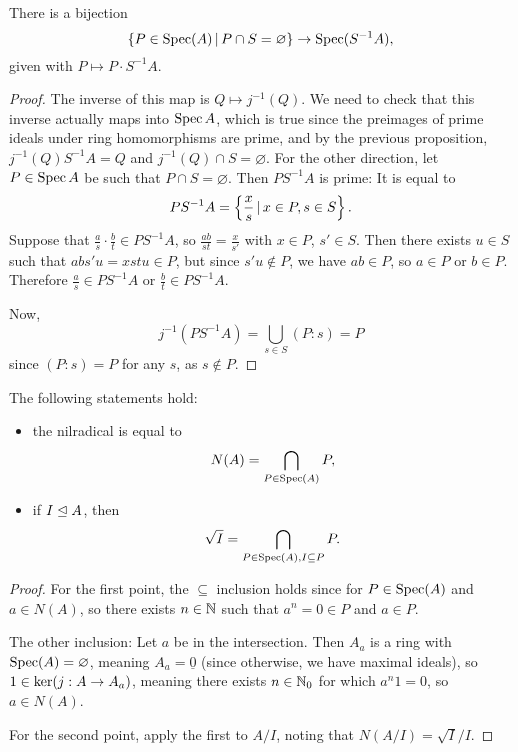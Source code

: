 \begin{corollary}
  There is a bijection
  \[
	\{ P \in \operatorname{Spec}(A) \,|\, P \cap S = \varnothing \}
	\to \operatorname{Spec}(S^{-1}A),
  \]
  given with $P \mapsto P \cdot S^{-1} A$.
\end{corollary}

\begin{proof}
  The inverse of this map is $Q \mapsto j^{-1}(Q)$.
  We need to check that this inverse actually maps into $\operatorname{Spec} A$, which is true
  since the preimages of prime ideals under ring homomorphisms are prime,
  and by the previous proposition, $j^{-1}(Q) S^{-1} A = Q$ and $j^{-1}(Q) \cap
  S = \varnothing$.
  For the other direction, let $P \in \operatorname{Spec} A$ be such that $P \cap S =
  \varnothing$.
  Then $P S^{-1} A$ is prime:
  It is equal to
  \[
	P S^{-1} A = \left\{ \frac{x}{s} \,|\, x \in P, s \in S \right\}.
  \]
  Suppose that $\frac{a}{s} \cdot \frac{b}{t} \in P S^{-1} A$, so $\frac{ab}{st}
  = \frac{x}{s'}$ with $x \in P$, $s' \in S$.
  Then there exists $u \in S$ such that $abs'u = xstu \in P$, but since $s'u
  \notin P$, we have $ab \in P$, so $a \in P$ or $b \in P$.
  Therefore $\frac{a}{s} \in P S^{-1} A$ or $\frac{b}{t} \in PS^{-1} A$.

  Now,
  \[
	j^{-1} (P S^{-1} A) = \bigcup_{s \in S} (P:s) = P
  \]
  since $(P:s) = P$ for any $s$, as $s \notin P$.
\end{proof}

\begin{corollary}
  The following statements hold:
  \begin{itemize}
  \item the nilradical is equal to
	\[
	  N(A) = \bigcap_{P \in \operatorname{Spec}(A)} P,
	\]
  \item if $I \trianglelefteq A$, then
	\[
	  \sqrt{I} = \bigcap_{P \in \operatorname{Spec}(A), I \subseteq P} P.
	\]
  \end{itemize}
\end{corollary}

\begin{proof}
  For the first point, the $\subseteq$ inclusion holds since for $P \in
  \operatorname{Spec}(A)$ and $a \in N(A)$, so there exists $n \in \mathbb{N}$ such that $a^n = 0 \in
  P$ and $a \in P$.

  The other inclusion:
  Let $a$ be in the intersection.
  Then $A_a$ is a ring with $\operatorname{Spec}(A) = \varnothing$, meaning $A_a =
  \underline{0}$ (since otherwise, we have maximal ideals), so $1 \in \operatorname{ker} (j:
  A \to A_a)$, meaning there exists $n \in \mathbb{N}_0$ for which $a^n 1 = 0$, so $a
  \in N(A)$.

  For the second point, apply the first to $A/I$, noting that $N(A/I) =
  \sqrt{I}/I$.
\end{proof}

